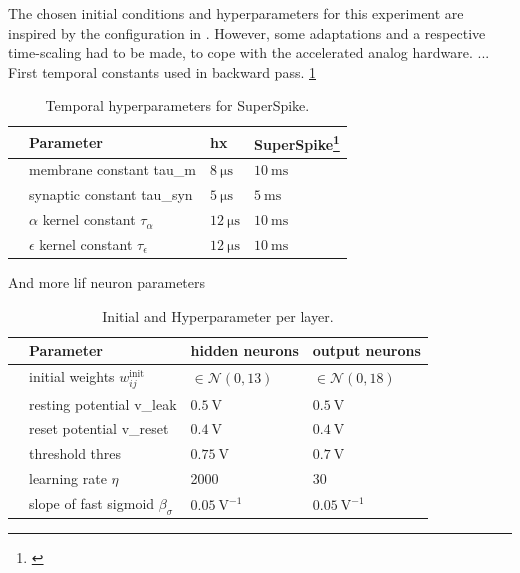 The chosen initial conditions and hyperparameters for this experiment are inspired by the configuration in \citealp{zenke2018superspike}. However, some adaptations and a respective time-scaling had to be made, to cope with the accelerated analog hardware. ...
First temporal constants used in backward pass. \cref{temporalconstants}
\begin{table}\centering{}
	\begin{tabular}{@{}rlll@{}}\toprule
		& Parameter		& 	\gls{hx} & 	SuperSpike\footnote{\citealp{zenke2018superspike}} \\ \midrule
		& membrane constant \gls{tau_m}		& 	$\SI{8}{\micro \s}$ & 	$\SI{10}{\milli \s}$\\
		& synaptic constant \gls{tau_syn}	&	$\SI{5}{\micro \s}$ & 	$\SI{5}{\milli \s}$\\
		& $\alpha$ kernel constant $\tau_\alpha$	&	$\SI{12}{\micro \s}$& 	$\SI{10}{\milli \s}$\\
		& $\epsilon$ kernel constant $\tau_\epsilon$ 	&	$\SI{12}{\micro \s}$& 	$\SI{10}{\milli \s}$\\
		\bottomrule
	\end{tabular}
	\caption[Temporal hyperparameters for SuperSpike.]{Temporal hyperparameters for SuperSpike.}
	\label{temporalconstants}
\end{table}

And more lif neuron parameters

\begin{table}\centering{}
	\begin{tabular}{@{}rlll@{}}\toprule
		& Parameter								& 	hidden neurons 			& 	output neurons \\ \midrule
		& initial weights $w_{ij}^\text{init}$	& 	$\in \mathcal{N}(0,13)$ & 	$\in \mathcal{N}(0,18)$\\
		& resting potential \gls{v_leak}		&	$\SI{0.5}{\V}$ 			& 	$\SI{0.5}{\V}$\\
		& reset potential \gls{v_reset}			&	$\SI{0.4}{\V}$			& 	$\SI{0.4}{\V}$\\
		& threshold \gls{thres} 				&	$\SI{0.75}{\V}$			& 	$\SI{0.7}{\V}$\\
		& learning rate $\eta$ 					&	2000					& 	30			\\
		& slope of fast sigmoid $\beta_\sigma$ 	&	$\SI{0.05}{\V^{-1}}$		& 	$\SI{0.05}{\V^{-1}}$	\\
		\bottomrule
	\end{tabular}
	\caption[Initial and Hyperparameter per layer.]{Initial and Hyperparameter per layer.}
\end{table}

